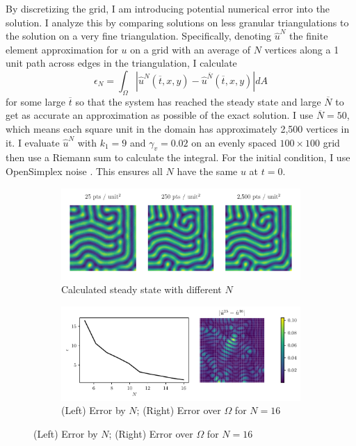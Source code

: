 By discretizing the grid, I am introducing potential numerical error into the solution. I analyze this by comparing solutions on less granular triangulations to the solution on a very fine triangulation. Specifically, denoting $\hat{u}^{N}$ the finite element approximation for $u$ on a grid with an average of $N$ vertices along a 1 unit path across edges in the triangulation, I calculate
\[
    \epsilon_N = \int_\Omega \left| \hat{u}^N (\overline{t}, x, y) - \hat{u}^{\overline{N}} (\overline{t}, x, y) \right| dA
\]
for some large $\overline{t}$ so that the system has reached the steady state and large $\overline{N}$ to get as accurate an approximation as possible of the exact solution. I use $\overline{N} = 50$, which means each square unit in the domain has approximately 2,500 vertices in it. I evaluate $\hat{u}^N$ with $k_1 = 9$ and $\gamma_v = 0.02$ on an evenly spaced $100 \times 100$ grid then use a Riemann sum to calculate the integral. For the initial condition, I use OpenSimplex noise \autocite{thorimbert2016polynomial}. This ensures all $N$ have the same $u$ at $t = 0$.

\begin{figure}[t!]
    \centering
    \caption{Numerical error in the solutions on a $10 \times 10$ square domain}

    \begin{subfigure}{\textwidth}
        \centering
        \includegraphics{figures/error.pdf}
        \caption{Calculated steady state with different $N$}
        \label{subfig:res-by-N}
    \end{subfigure}

    \begin{subfigure}{\textwidth}
        \centering
        \includegraphics{figures/err_ovr_N.pdf}
        \caption{(Left) Error by $N$; (Right) Error over $\Omega$ for $N = 16$}
        \label{subfig:err-over-N}
    \end{subfigure}

    \label{fig:err}
\end{figure}

